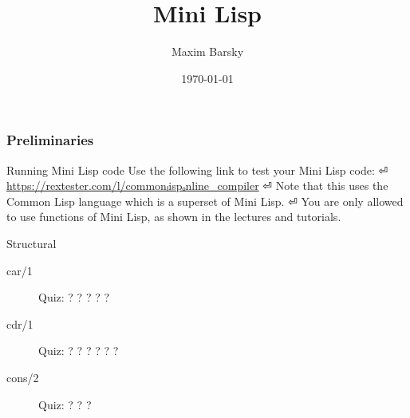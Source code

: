 \documentclass[fleqn]{beamer}
\title{Mini Lisp}
\author{Maxim Barsky}
\institute[Programming Languages- 236319]{Programming Languages⏎ 236319}
\date{\today}
\begin{document}
\setLTR
\begin{frame}
\titlepage
\end{frame}

\begin{frame}
\frametitle{Preliminaries}
\begin{block}{Running Mini Lisp code}
  Use the following link to test your Mini Lisp code: ⏎
  \url{https://rextester.com/l/commonₗispₒnline_compiler} ⏎
  Note that this uses the Common Lisp language which is a superset of Mini Lisp. ⏎
  You are only allowed to use functions of Mini Lisp, as shown in the lectures and tutorials.
\end{block}
\end{frame}

\begin{frame}%
\begin{block}{Structural}
  \begin{description}
    \item[car/1] Quiz:
      ?
      ?
      ?
      ?
      ?
    \item[cdr/1] Quiz:
      ?
      ?
      ?
      ?
      ?
      ?
    \item[cons/2] Quiz:
      ?
      ?
      ?
  \end{description}
\end{block}
\end{frame}
\end{document}

